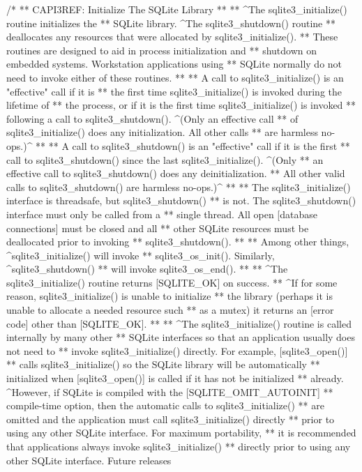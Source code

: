 \begin{Codex}[label=sqlite3.h,numbers=left]
{/*
** CAPI3REF: Initialize The SQLite Library
**
** ^The sqlite3_initialize() routine initializes the
** SQLite library.  ^The sqlite3_shutdown() routine
** deallocates any resources that were allocated by sqlite3_initialize().
** These routines are designed to aid in process initialization and
** shutdown on embedded systems.  Workstation applications using
** SQLite normally do not need to invoke either of these routines.
**
** A call to sqlite3_initialize() is an "effective" call if it is
** the first time sqlite3_initialize() is invoked during the lifetime of
** the process, or if it is the first time sqlite3_initialize() is invoked
** following a call to sqlite3_shutdown().  ^(Only an effective call
** of sqlite3_initialize() does any initialization.  All other calls
** are harmless no-ops.)^
**
** A call to sqlite3_shutdown() is an "effective" call if it is the first
** call to sqlite3_shutdown() since the last sqlite3_initialize().  ^(Only
** an effective call to sqlite3_shutdown() does any deinitialization.
** All other valid calls to sqlite3_shutdown() are harmless no-ops.)^
**
** The sqlite3_initialize() interface is threadsafe, but sqlite3_shutdown()
** is not.  The sqlite3_shutdown() interface must only be called from a
** single thread.  All open [database connections] must be closed and all
** other SQLite resources must be deallocated prior to invoking
** sqlite3_shutdown().
**
** Among other things, ^sqlite3_initialize() will invoke
** sqlite3_os_init().  Similarly, ^sqlite3_shutdown()
** will invoke sqlite3_os_end().
**
** ^The sqlite3_initialize() routine returns [SQLITE_OK] on success.
** ^If for some reason, sqlite3_initialize() is unable to initialize
** the library (perhaps it is unable to allocate a needed resource such
** as a mutex) it returns an [error code] other than [SQLITE_OK].
**
** ^The sqlite3_initialize() routine is called internally by many other
** SQLite interfaces so that an application usually does not need to
** invoke sqlite3_initialize() directly.  For example, [sqlite3_open()]
** calls sqlite3_initialize() so the SQLite library will be automatically
** initialized when [sqlite3_open()] is called if it has not be initialized
** already.  ^However, if SQLite is compiled with the [SQLITE_OMIT_AUTOINIT]
** compile-time option, then the automatic calls to sqlite3_initialize()
** are omitted and the application must call sqlite3_initialize() directly
** prior to using any other SQLite interface.  For maximum portability,
** it is recommended that applications always invoke sqlite3_initialize()
** directly prior to using any other SQLite interface.  Future releases
}
\end{Codex}
